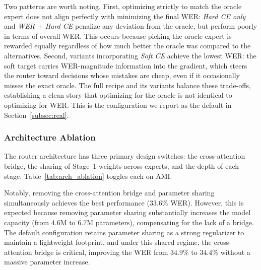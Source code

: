 \documentclass[journal]{IEEEtran}
\begin{document}
Two patterns are worth noting. First, optimizing strictly to match the oracle expert does not align perfectly with minimizing the final WER: \emph{Hard CE only} and \emph{WER $+$ Hard CE} penalize any deviation from the oracle, but perform poorly in terms of overall WER. This occurs because picking the oracle expert is rewarded equally regardless of how much better the oracle was compared to the alternatives. Second, variants incorporating \emph{Soft CE} achieve the lowest WER: the soft target carries WER-magnitude information into the gradient, which steers the router toward decisions whose mistakes are cheap, even if it occasionally misses the exact oracle. The full recipe and its variants balance these trade-offs, establishing a clean story that optimizing for the oracle is not identical to optimizing for WER. This is the configuration we report as the default in Section~\ref{subsec:real}.

\subsubsection{Architecture Ablation}

The router architecture has three primary design switches: the
cross-attention bridge, the sharing of Stage~1 weights across
experts, and the depth of each stage. Table~\ref{tab:arch_ablation}
toggles each on AMI.

Notably, removing the cross-attention bridge and parameter sharing 
simultaneously achieves the best performance ($33.6\%$ WER). However, 
this is expected because removing parameter sharing substantially 
increases the model capacity (from $4.6$M to $6.7$M parameters), 
compensating for the lack of a bridge. The default configuration 
retains parameter sharing as a strong regularizer to maintain a 
lightweight footprint, and under this shared regime, the 
cross-attention bridge is critical, improving the WER from $34.9\%$ 
to $34.4\%$ without a massive parameter increase.
\end{document}
